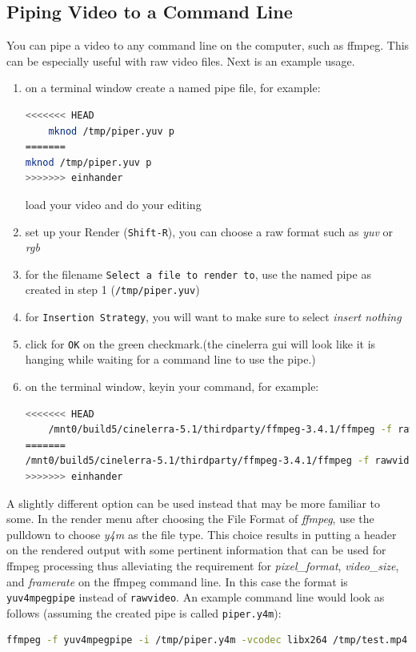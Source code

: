 \subsection{Piping Video to a Command Line}%
\label{sub:piping_video_command_line}

You can pipe a video to any command line on the computer, such as ffmpeg.  This can be especially useful with raw video files.  Next is an example usage.

\begin{enumerate}
    \item on a terminal window create a named pipe file, for example:
    \begin{lstlisting}[language=bash]
<<<<<<< HEAD
    mknod /tmp/piper.yuv p
=======
mknod /tmp/piper.yuv p
>>>>>>> einhander
    \end{lstlisting}
    load your video and do your editing
    \item set up your Render (\texttt{Shift-R}), you can choose a raw format such as \textit{yuv} or \textit{rgb}
    \item for the filename \texttt{Select a file to render to}, use the named pipe as created in step 1 (\texttt{/tmp/piper.yuv})
    \item for \texttt{Insertion Strategy}, you will want to make sure to select \textit{insert nothing}
    \item click for \texttt{OK} on the green checkmark.(the cinelerra gui will look like it is hanging while waiting for a command line to use the pipe.)
    \item on the terminal window, keyin your command, for example:
    \begin{lstlisting}[language=bash]
<<<<<<< HEAD
    /mnt0/build5/cinelerra-5.1/thirdparty/ffmpeg-3.4.1/ffmpeg -f rawvideo -pixel_format yuv420p \ -video_size 1280x720 -framerate 30000/1001 -i /tmp/piper.yuv /tmp/pys.mov
=======
/mnt0/build5/cinelerra-5.1/thirdparty/ffmpeg-3.4.1/ffmpeg -f rawvideo -pixel_format yuv420p \ -video_size 1280x720 -framerate 30000/1001 -i /tmp/piper.yuv /tmp/pys.mov
>>>>>>> einhander
    \end{lstlisting}
\end{enumerate}

A slightly different option can be used instead that may be more familiar to some.  In the render menu after choosing the File Format of \textit{ffmpeg}, use the pulldown to choose \textit{y4m} as the file type.  This choice results in putting a header on the rendered output with some pertinent information that can be used for ffmpeg processing thus alleviating the requirement for \textit{pixel\_format}, \textit{video\_size}, and \textit{framerate} on the ffmpeg command line.  In this case the format is \texttt{yuv4mpegpipe} instead of \texttt{rawvideo}.  An example command line would look as follows (assuming the created pipe is called \texttt{piper.y4m}):
\begin{lstlisting}[language=bash]
ffmpeg -f yuv4mpegpipe -i /tmp/piper.y4m -vcodec libx264 /tmp/test.mp4
\end{lstlisting}

